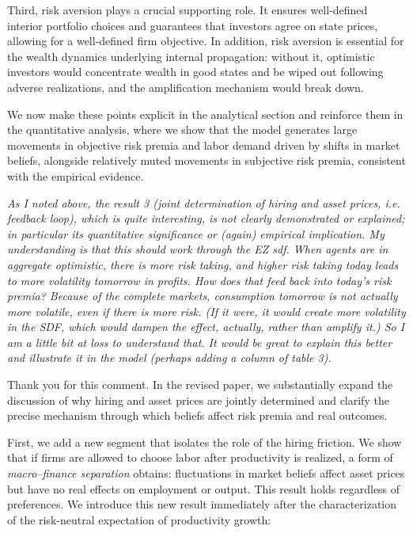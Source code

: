 \documentclass[12pt,a4paper]{article}
\newcommand{\commentbox}[1]{
\begin{mdframed}[style=commentbox] 
		\textit{#1}
\end{mdframed}}
\begin{document}
Third, risk aversion plays a crucial supporting role. It ensures well-defined interior
portfolio choices and guarantees that investors agree on state prices, allowing for a
well-defined firm objective. In addition, risk aversion is essential for the wealth
dynamics underlying internal propagation: without it, optimistic investors would
concentrate wealth in good states and be wiped out following adverse realizations, and the
amplification mechanism would break down.

We now make these points explicit in the analytical section and reinforce them in the
quantitative analysis, where we show that the model generates large movements in objective
risk premia and labor demand driven by shifts in market beliefs, alongside relatively
muted movements in subjective risk premia, consistent with the empirical evidence.






\commentbox{
	As I noted above, the result 3 (joint determination of hiring and asset prices, i.e. feedback loop), which is quite interesting, is not clearly demonstrated or explained; 
	in particular its quantitative significance or (again) empirical implication. My understanding is that this should work through the EZ sdf. 
	When agents are in aggregate optimistic, there is more risk taking, and higher risk taking today leads to more volatility tomorrow in profits. How does that feed back into today's risk premia? Because of the complete markets, consumption tomorrow is not actually more volatile, even if there is more risk. (If it were, it would create more volatility in the SDF, which would dampen the effect, actually, rather than amplify it.)  So I am a little bit at loss to understand that. It would be great to explain this better and illustrate it in the model (perhaps adding a column of table 3).
}

Thank you for this comment. In the revised paper, we substantially expand the discussion
of why hiring and asset prices are jointly determined and clarify the precise mechanism
through which beliefs affect risk premia and real outcomes.

First, we add a new segment that isolates the role of the hiring friction. We show that
if firms are allowed to choose labor after productivity is realized, a form of
\emph{macro--finance separation} obtains: fluctuations in market beliefs affect asset
prices but have no real effects on employment or output. This result holds regardless of
preferences. We introduce this new result immediately after the characterization of the
risk-neutral expectation of productivity growth:
\end{document}
